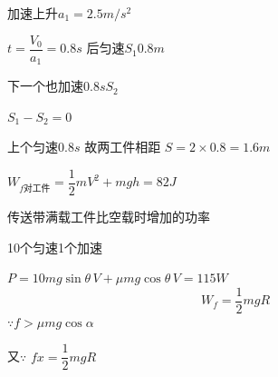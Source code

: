 
加速上升\quad $a_1=2.5\unit{m/s^2}$

$t=\dfrac{V_0}{a_1}=0.8\unit{s}$ 后匀速\quad $S_1$\quad $0.8\unit{m}$

下一个也加速$0.8\unit{s}$\quad $S_2$

$S_1-S_2=0$

上个匀速$0.8\unit{s}$ 故两工件相距 $S=2\times0.8=1.6\unit{m}$

$W_{f\text{对工件}}=\dfrac12 mV^2+mgh=82\unit{J}$

传送带满载工件比空载时增加的功率

10个匀速\quad 1个加速

$P=10mg\sin\theta\,V+\mu mg\cos\theta\,V=115\unit{W}$
\[
W_f=\frac{1}{2}mgR
\]
$\because f>\mu mg\cos\alpha$

又$\because$ $fx=\dfrac{1}{2}mgR$

